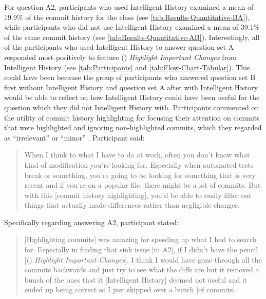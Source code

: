 For question A2, participants who used Intelligent History examined a mean of 19.9\% of the commit history for the  class (see \autoref{tab:Results-Quantitative-BA}),
while participants who did not use Intelligent History examined a mean of 39.1\% of the same commit history (see \autoref{tab:Results-Quantitative-AB}). 
Interestingly, all of the participants who used Intelligent History to answer question set A 
responded most positively to feature () \textit{Highlight Important Changes} from Intelligent History  
(see \autoref{tab:Participants} and \autoref{tab:Flow-Chart-Tabular}).
This could have been because the group of participants who answered question set B first without Intelligent History 
and question set A after with Intelligent History would be able to reflect on how Intelligent History 
could have been useful for the question which they did not Intelligent History with.
Participants commented on the utility of commit history highlighting for focusing their attention on commits that were highlighted 
and ignoring non-highlighted commits, which they regarded as ``irrelevant'' or ``minor'' .
Participant  said:

\begin{quote}
  When I think to what I have to do at work, 
  often you don’t know what kind of modification you’re looking for. 
  Especially when automated tests break or something, 
  you’re going to be looking for something that is very recent and if you’re on a popular file, 
  there might be a lot of commits. 
  But with this [commit history highlighting], 
  you’d be able to easily filter out things that actually made differences rather than negligible changes.
\end{quote}

Specifically regarding answering A2, participant  stated:

\begin{quote}
  [Highlighting commits] was amazing for speeding up what I had to search for. 
  Especially in finding that sink issue [in A2], if I didn’t have the pencil 
  [() \textit{Highlight Important Changes}], 
  I think I would have gone through all the commits backwards and just try to see what the diffs are 
  but it removed a bunch of the ones that it [Intelligent History] deemed not useful 
  and it ended up being correct so I just skipped over a bunch [of commits].
\end{quote}

